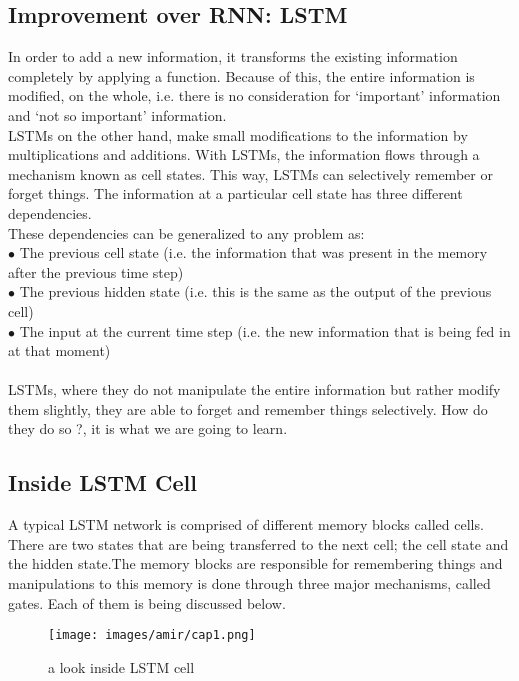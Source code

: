 \subsection{Improvement over RNN: LSTM}
In order to add a new information, it transforms the existing information completely by applying a function. Because of this, the entire information is modified, on the whole, i.e. there is no consideration for ‘important’ information and ‘not so important’ information.\\
LSTMs on the other hand, make small modifications to the information by multiplications and additions. With LSTMs, the information flows through a mechanism known as cell states. This way, LSTMs can selectively remember or forget things. The information at a particular cell state has three different dependencies.\\
These dependencies can be generalized to any problem as:\\
\indent$\bullet$ The previous cell state (i.e. the information that was present in the memory after the previous time step)\\
\indent$\bullet$ The previous hidden state (i.e. this is the same as the output of the previous cell)\\
\indent$\bullet$ The input at the current time step (i.e. the new information that is being fed in at that moment)\\\\
 LSTMs, where they do not manipulate the entire information but rather modify them slightly, they are able to forget and remember things selectively. How do they do so ?, it is what we are going to learn.
 \subsection{Inside LSTM Cell}
 A typical LSTM network is comprised of different memory blocks called cells.
   There are two states that are being transferred to the next cell; the cell state and the hidden state.The memory blocks are responsible for remembering things and manipulations to this memory is done through three major mechanisms, called gates. Each of them is being discussed below.
 \begin{figure}[H]%
    \center%
    \texttt{[image: images/amir/cap1.png]}%
    \caption[This is lstm-inside image]{a look inside LSTM cell}\label{fig:lstm inside}%
  \end{figure}
